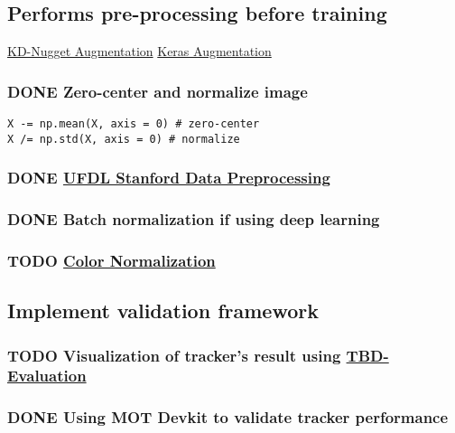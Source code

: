 \documentclass[11pt]{article}
\begin{document}
\subsection{Performs pre-processing before training}
\label{sec:org1041e48}
\href{http://www.kdnuggets.com/2016/03/must-know-tips-deep-learning-part-1.html}{KD-Nugget Augmentation}
\href{http://machinelearningmastery.com/image-augmentation-deep-learning-keras/}{Keras Augmentation}
\subsubsection{{\bfseries\sffamily DONE} Zero-center and normalize image}
\label{sec:org3844004}
\begin{verbatim}
X -= np.mean(X, axis = 0) # zero-center
X /= np.std(X, axis = 0) # normalize
\end{verbatim}
\subsubsection{{\bfseries\sffamily DONE} \href{http://ufldl.stanford.edu/wiki/index.php/Data\_Preprocessing}{UFDL Stanford Data Preprocessing}}
\label{sec:org043e34f}
\subsubsection{{\bfseries\sffamily DONE} Batch normalization if using deep learning}
\label{sec:orge203ca7}
\subsubsection{{\bfseries\sffamily TODO} \href{https://en.wikipedia.org/wiki/Color\_normalization\#Comprehensive\_Color\_Normalization}{Color Normalization}}
\label{sec:org6c49e15}
\subsection{Implement validation framework}
\label{sec:org2fa6e11}
\subsubsection{{\bfseries\sffamily TODO} Visualization of tracker's result using \href{https://github.com/jinified/TBD-evaluation}{TBD-Evaluation}}
\label{sec:orgf836833}
\subsubsection{{\bfseries\sffamily DONE} Using MOT Devkit to validate tracker performance}
\label{sec:org753701e}
\end{document}
